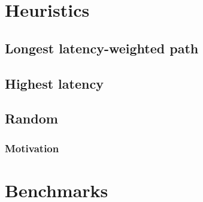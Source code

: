 \documentclass{article}
\begin{document}
\section{Heuristics}
\subsection{Longest latency-weighted path}
\subsection{Highest latency}
\subsection{Random}
\subsubsection{Motivation}

\section{Benchmarks}
\end{document}
